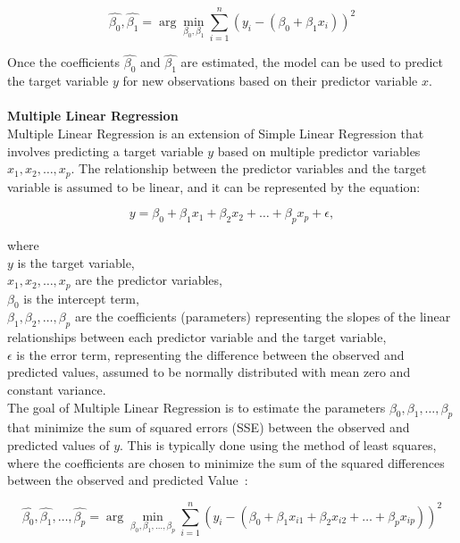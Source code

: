\documentclass[12pt]{article}
\begin{document}
\begin{equation}
    \hat{\beta_0}, \hat{\beta_1} = \arg \min_{\beta_0, \beta_1} \sum_{i=1}^{n} (y_i - (\beta_0 + \beta_1 x_i))^2
\end{equation}

\noindent Once the coefficients \(\hat{\beta_0}\) and \(\hat{\beta_1}\) are estimated, the
model can be used to predict the target variable \(y\) for new observations based on their
predictor variable \(x\).\\
\\
\textbf{Multiple Linear Regression}\\
Multiple Linear Regression is an extension of Simple Linear Regression that involves predicting a target variable \(y\) based on multiple predictor variables \(x_1, x_2, \ldots, x_p\). The relationship between the predictor variables and the target variable is assumed to be linear, and it can be represented by the equation:

\begin{equation}
    y = \beta_0 + \beta_1 x_1 + \beta_2 x_2 + \ldots + \beta_p x_p + \epsilon,
\end{equation}

\noindent where\\
\(y\) is the target variable,\\
\(x_1, x_2, \ldots, x_p\) are the predictor variables,\\
\(\beta_0\) is the intercept term,\\
\(\beta_1, \beta_2, \ldots, \beta_p\) are the coefficients (parameters) representing the slopes of the linear relationships between each predictor variable and the target variable,\\
\(\epsilon\) is the error term, representing the difference between the observed and predicted values, assumed to be normally distributed with mean zero and constant variance.\\

\noindent The goal of Multiple Linear Regression is to estimate the
parameters \(\beta_0, \beta_1, \ldots, \beta_p\) that minimize the sum of squared
errors (SSE) between the observed and predicted values of \(y\). This is typically done
using the method of least squares, where the coefficients are chosen to minimize the
sum of the squared differences between the observed and predicted Value~\cite{witte2017statistics}:

\begin{equation}
    \hat{\beta_0}, \hat{\beta_1}, \ldots, \hat{\beta_p} = \arg \min_{\beta_0, \beta_1, \ldots, \beta_p} \sum_{i=1}^{n} (y_i - (\beta_0 + \beta_1 x_{i1} + \beta_2 x_{i2} + \ldots + \beta_p x_{ip}))^2
\end{equation}
\end{document}
